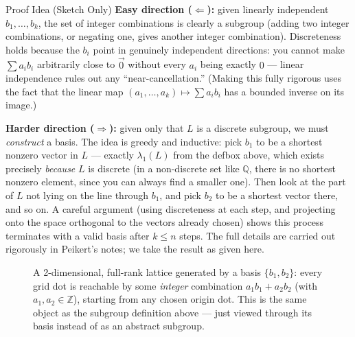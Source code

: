 \begin{rmkbox}{Proof Idea (Sketch Only)}
\textbf{Easy direction ($\Leftarrow$):} given linearly independent $b_1,\ldots,b_k$, the set of integer combinations is clearly a subgroup (adding two integer combinations, or negating one, gives another integer combination). Discreteness holds because the $b_i$ point in genuinely independent directions: you cannot make $\sum a_i b_i$ arbitrarily close to $\vec 0$ without every $a_i$ being exactly $0$ --- linear independence rules out any ``near-cancellation.'' (Making this fully rigorous uses the fact that the linear map $(a_1,\ldots,a_k) \mapsto \sum a_i b_i$ has a bounded inverse on its image.)

\textbf{Harder direction ($\Rightarrow$):} given only that $L$ is a discrete subgroup, we must \emph{construct} a basis. The idea is greedy and inductive: pick $b_1$ to be a shortest nonzero vector in $L$ --- exactly $\lambda_1(L)$ from the defbox above, which exists precisely \emph{because} $L$ is discrete (in a non-discrete set like $\mathbb{Q}$, there is no shortest nonzero element, since you can always find a smaller one). Then look at the part of $L$ not lying on the line through $b_1$, and pick $b_2$ to be a shortest vector there, and so on. A careful argument (using discreteness at each step, and projecting onto the space orthogonal to the vectors already chosen) shows this process terminates with a valid basis after $k \le n$ steps. The full details are carried out rigorously in Peikert's notes; we take the result as given here.
\end{rmkbox}

\begin{figure}[ht]
\centering
{}
\caption{A 2-dimensional, full-rank lattice generated by a basis $\{b_1, b_2\}$: every grid dot is reachable by some \emph{integer} combination $a_1 b_1 + a_2 b_2$ (with $a_1, a_2 \in \mathbb{Z}$), starting from any chosen origin dot. This is the same object as the subgroup definition above --- just viewed through its basis instead of as an abstract subgroup.}
\label{fig:latticegrid}
\end{figure}

